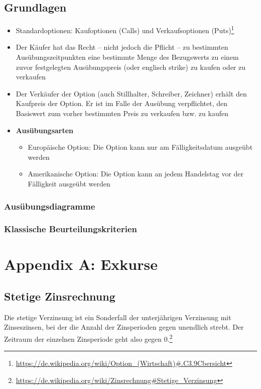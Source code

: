 \subsection{Grundlagen}
\begin{itemize}
	\item Standardoptionen: Kaufoptionen (Calls) und Verkaufsoptionen (Puts)\footnote{\url{https://de.wikipedia.org/wiki/Option_(Wirtschaft)\#.C3.9Cbersicht}}
	\item Der Käufer hat das Recht – nicht jedoch die Pflicht – zu bestimmten Ausübungszeitpunkten eine bestimmte Menge des Bezugswerts zu einem zuvor festgelegten Ausübungspreis (oder englisch strike) zu kaufen oder zu verkaufen
	\item Der Verkäufer der Option (auch Stillhalter, Schreiber, Zeichner) erhält den Kaufpreis der Option. Er ist im Falle der Ausübung verpflichtet, den Basiswert zum vorher bestimmten Preis zu verkaufen bzw. zu kaufen
	\item \textbf{Ausübungsarten}
	\begin{itemize}
		\item Europäische Option: Die Option kann nur am Fälligkeitsdatum ausgeübt werden
		\item Amerikanische Option: Die Option kann an jedem Handelstag vor der Fälligkeit ausgeübt werden
	\end{itemize}
\end{itemize}


\subsubsection{Ausübungsdiagramme}

\subsubsection{Klassische Beurteilungskriterien}



\section{Appendix A: Exkurse}

\subsection{Stetige Zinsrechnung}

Die stetige Verzinsung ist ein Sonderfall der unterjährigen Verzinsung mit Zinseszinsen, bei der die Anzahl der Zinsperioden gegen unendlich strebt. Der Zeitraum der einzelnen Zinsperiode geht also gegen \(0\).\footnote{\url{https://de.wikipedia.org/wiki/Zinsrechnung\#Stetige_Verzinsung}}

